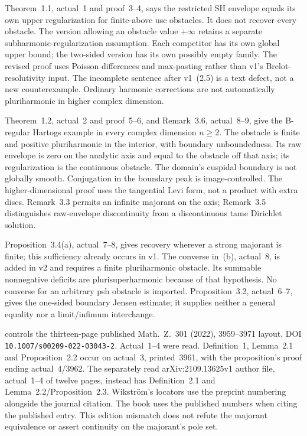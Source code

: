 Theorem~1.1, actual~1 and proof~3--4, says the restricted SH envelope
equals its own upper regularization for finite-above usc obstacles.
It does not recover every obstacle. The version allowing an obstacle
value $+\infty$ retains a separate subharmonic-regularization assumption.
Each competitor has its own global upper bound; the two-sided version
has its own possibly empty family. The revised proof uses Poisson
differences and max-pasting rather than v1's Brelot-resolutivity input.
The incomplete sentence after v1~(2.5) is a text defect, not a new
counterexample. Ordinary harmonic corrections are not automatically
pluriharmonic in higher complex dimension.

Theorem~1.2, actual~2 and proof~5--6, and Remark~3.6, actual~8--9,
give the B-regular Hartogs example in every complex dimension $n\geq2$.
The obstacle is finite and positive pluriharmonic in the interior, with
boundary unboundedness. Its raw envelope is zero on the analytic axis
and equal to the obstacle off that axis; its regularization is the
continuous obstacle. The domain's cuspidal boundary is not globally
smooth. Conjugation in the boundary peak is image-controlled.
The higher-dimensional proof uses the tangential Levi form, not a
product with extra discs. Remark~3.3 permits an infinite majorant
on the axis; Remark~3.5 distinguishes raw-envelope discontinuity from
a discontinuous tame Dirichlet solution.

Proposition~3.4(a), actual~7--8, gives recovery wherever a strong
majorant is finite; this sufficiency already occurs in v1.
The converse in~(b), actual~8, is added in v2 and requires a finite
pluriharmonic obstacle. Its summable nonnegative deficits are
plurisuperharmonic because of that hypothesis. No converse for an
arbitrary psh obstacle is imported. Proposition~3.2, actual~6--7,
gives the one-sided boundary Jensen estimate; it supplies neither a
general equality nor a limit/infimum interchange.

\cite{Nilsson22EnvelopesPublished} controls the thirteen-page published
Math.~Z.~301 (2022), 3959--3971 layout, DOI
\nolinkurl{10.1007/s00209-022-03043-2}. Actual~1--4 were read.
Definition~1, Lemma~2.1 and Proposition~2.2 occur on actual~3,
printed~3961, with the proposition's proof ending actual~4/3962.
The separately read arXiv:2109.13625v1 author file, actual~1--4 of
twelve pages, instead has Definition~2.1 and Lemma~2.2/Proposition~2.3.
Wikstr\"om's locators use the preprint numbering alongside the journal
citation. The book uses the published numbers when citing the
published entry. This edition mismatch does not refute the majorant
equivalence or assert continuity on the majorant's pole set.

